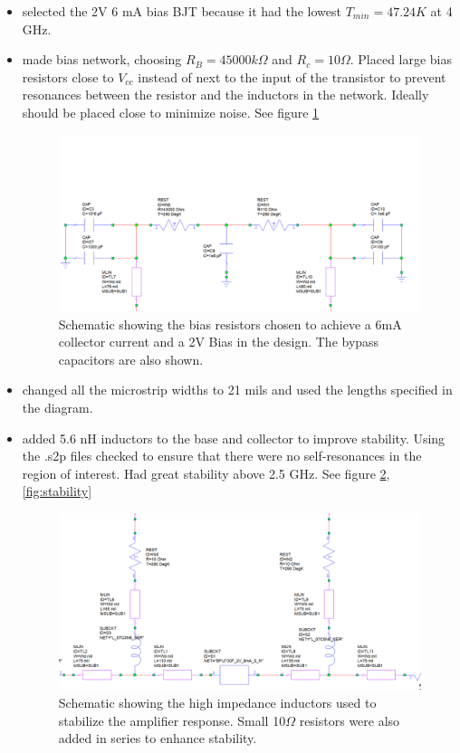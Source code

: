 \documentclass[twocolumn, aps, apl]{revtex4-1}
\begin{document}
\begin{itemize}
    \item selected the 2V 6 mA bias BJT because it had the lowest $T_{min} = 47.24 K$ at 4 GHz.

    \item made bias network, choosing $R_B = 45000 k \Omega$ and $R_c = 10 \Omega$. Placed large bias resistors close to $V_{cc}$ instead of next to the input of the transistor to prevent resonances between the resistor and the inductors in the network. Ideally should be placed close to minimize noise. See figure \ref{fig:dcnet}

    \begin{figure}[!htbp]
        \centering
        \includegraphics[scale=0.35]{dc_net.png}
        \caption{Schematic showing the bias resistors chosen to achieve a 6mA collector current and a 2V Bias in the design. The bypass capacitors are also shown.}
        \label{fig:dcnet}
    \end{figure}

    \item changed all the microstrip widths to 21 mils and used the lengths specified in the diagram.

    \item added 5.6 nH inductors to the base and collector to improve stability. Using the .s2p files checked to ensure that there were no self-resonances in the region of interest. Had great stability above 2.5 GHz. See figure \ref{fig:LNAnet}, \ref{fig:stability}

    \begin{figure}[!htbp]
        \centering
        \includegraphics[scale=0.35]{LNA_net.png}
        \caption{Schematic showing the high impedance inductors used to stabilize the amplifier response. Small 10$\Omega$ resistors were also added in series to enhance stability.}
        \label{fig:LNAnet}
    \end{figure}


\end{itemize}
\end{document}
